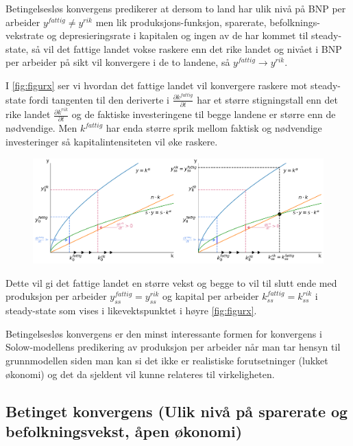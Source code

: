 \documentclass[
  12pt,
  a4paper,
  DIV=11,
  numbers=noendperiod]{scrartcl}
\begin{document}
Betingelsesløs konvergens predikerer at dersom to land har ulik nivå på
BNP per arbeider \(y^{fattig} \neq y^{rik}\) men lik
produksjons-funksjon, sparerate, befolknings-vekstrate og
depresieringsrate i kapitalen og ingen av de har kommet til
steady-state, så vil det fattige landet vokse raskere enn det rike
landet og nivået i BNP per arbeider på sikt vil konvergere i de to
landene, så \(y^{fattig} \rightarrow y^{rik}\).

I \autoref{fig:figurx} ser vi hvordan det fattige landet vil konvergere
raskere mot steady-state fordi tangenten til den deriverte i
\(\frac{\partial k^{fattig}}{\partial t}\) har et større stigningstall
enn det rike landet \(\frac{\partial k^{rik}}{\partial t}\) og de
faktiske investeringene til begge landene er større enn de nødvendige.
Men \(k^{fattig}\) har enda større sprik mellom faktisk og nødvendige
investeringer så kapitalintensiteten vil øke raskere.

\begin{figure}[h]
\centering
  \includegraphics[width=\linewidth]{figurx.png}
  \label{fig:figurx}
\end{figure}

Dette vil gi det fattige landet en større vekst og begge to vil til
slutt ende med produksjon per arbeider
\(y^{fattig}_{ss} = y^{rik}_{ss}\) og kapital per arbeider
\(k^{fattig}_{ss} = k^{rik}_{ss}\) i steady-state som vises i
likevektspunktet i høyre \autoref{fig:figurx}.

Betingelsesløs konvergens er den minst interessante formen for
konvergens i Solow-modellens predikering av produksjon per arbeider når
man tar hensyn til grunnmodellen siden man kan si det ikke er
realistiske forutsetninger (lukket økonomi) og det da sjeldent vil kunne
relateres til virkeligheten.

\clearpage

\subsection{\texorpdfstring{\textbf{Betinget konvergens} (Ulik nivå på
sparerate og befolkningsvekst, åpen
økonomi)}{Betinget konvergens (Ulik nivå på sparerate og befolkningsvekst, åpen økonomi)}}\label{betinget-konvergens-ulik-nivuxe5-puxe5-sparerate-og-befolkningsvekst-uxe5pen-uxf8konomi}
\end{document}
